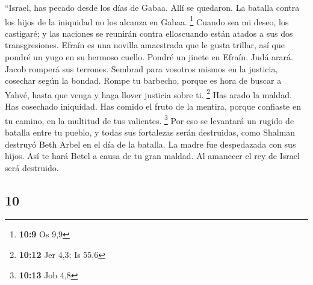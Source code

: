 \begin{paracol}{2}
 ``Israel, has pecado desde los días de Gabaa. Allí se
quedaron. La batalla contra los hijos de la iniquidad no los alcanza en
Gabaa. \footnote{\textbf{10:9} Os 9,9}  Cuando sea mi
deseo, los castigaré; y las naciones se reunirán contra elloscuando
están atados a sus dos transgresiones.  Efraín es una
novilla amaestrada que le gusta trillar, así que pondré un yugo en su
hermoso cuello. Pondré un jinete en Efraín. Judá arará. Jacob romperá
sus terrones.  Sembrad para vosotros mismos en la
justicia, cosechar según la bondad. Rompe tu barbecho, porque es hora de
buscar a Yahvé, hasta que venga y haga llover justicia sobre ti.
\footnote{\textbf{10:12} Jer 4,3; Is 55,6}  Has arado la
maldad. Has cosechado iniquidad. Has comido el fruto de la mentira,
porque confiaste en tu camino, en la multitud de tus valientes.
\footnote{\textbf{10:13} Job 4,8}  Por eso se levantará
un rugido de batalla entre tu pueblo, y todas sus fortalezas serán
destruidas, como Shalman destruyó Beth Arbel en el día de la batalla. La
madre fue despedazada con sus hijos.  Así te hará Betel a
causa de tu gran maldad. Al amanecer el rey de Israel será destruido.

\switchcolumn
\begin{otherlanguage}{english}

\hypertarget{section-19}{%
\section{10}\label{section-19}}


\end{otherlanguage}
\end{paracol}
